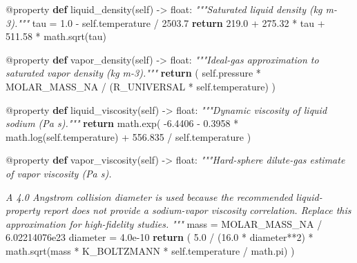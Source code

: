 \documentclass[
  12pt,
  12pt,a4paper,oneside]{report}
\newenvironment{Shaded}{}{}
\newcommand{\AttributeTok}[1]{\textcolor[rgb]{0.49,0.56,0.16}{#1}}
\newcommand{\BuiltInTok}[1]{\textcolor[rgb]{0.00,0.50,0.00}{#1}}
\newcommand{\CommentTok}[1]{\textcolor[rgb]{0.38,0.63,0.69}{\textit{#1}}}
\newcommand{\ControlFlowTok}[1]{\textcolor[rgb]{0.00,0.44,0.13}{\textbf{#1}}}
\newcommand{\DecValTok}[1]{\textcolor[rgb]{0.25,0.63,0.44}{#1}}
\newcommand{\FloatTok}[1]{\textcolor[rgb]{0.25,0.63,0.44}{#1}}
\newcommand{\KeywordTok}[1]{\textcolor[rgb]{0.00,0.44,0.13}{\textbf{#1}}}
\newcommand{\NormalTok}[1]{#1}
\newcommand{\OperatorTok}[1]{\textcolor[rgb]{0.40,0.40,0.40}{#1}}
\newcommand{\VariableTok}[1]{\textcolor[rgb]{0.10,0.09,0.49}{#1}}
\begin{document}
\begin{Shaded}
\begin{Highlighting}[]
    \AttributeTok{@property}
    \KeywordTok{def}\NormalTok{ liquid\_density(}\VariableTok{self}\NormalTok{) }\OperatorTok{{-}\textgreater{}} \BuiltInTok{float}\NormalTok{:}
        \CommentTok{"""Saturated liquid density (kg m{-}3)."""}
\NormalTok{        tau }\OperatorTok{=} \FloatTok{1.0} \OperatorTok{{-}} \VariableTok{self}\NormalTok{.temperature }\OperatorTok{/} \FloatTok{2503.7}
        \ControlFlowTok{return} \FloatTok{219.0} \OperatorTok{+} \FloatTok{275.32} \OperatorTok{*}\NormalTok{ tau }\OperatorTok{+} \FloatTok{511.58} \OperatorTok{*}\NormalTok{ math.sqrt(tau)}

    \AttributeTok{@property}
    \KeywordTok{def}\NormalTok{ vapor\_density(}\VariableTok{self}\NormalTok{) }\OperatorTok{{-}\textgreater{}} \BuiltInTok{float}\NormalTok{:}
        \CommentTok{"""Ideal{-}gas approximation to saturated vapor density (kg m{-}3)."""}
        \ControlFlowTok{return}\NormalTok{ (}
            \VariableTok{self}\NormalTok{.pressure }\OperatorTok{*}\NormalTok{ MOLAR\_MASS\_NA}
            \OperatorTok{/}\NormalTok{ (R\_UNIVERSAL }\OperatorTok{*} \VariableTok{self}\NormalTok{.temperature)}
\NormalTok{        )}

    \AttributeTok{@property}
    \KeywordTok{def}\NormalTok{ liquid\_viscosity(}\VariableTok{self}\NormalTok{) }\OperatorTok{{-}\textgreater{}} \BuiltInTok{float}\NormalTok{:}
        \CommentTok{"""Dynamic viscosity of liquid sodium (Pa s)."""}
        \ControlFlowTok{return}\NormalTok{ math.exp(}
            \OperatorTok{{-}}\FloatTok{6.4406} \OperatorTok{{-}} \FloatTok{0.3958} \OperatorTok{*}\NormalTok{ math.log(}\VariableTok{self}\NormalTok{.temperature)}
            \OperatorTok{+} \FloatTok{556.835} \OperatorTok{/} \VariableTok{self}\NormalTok{.temperature}
\NormalTok{        )}

    \AttributeTok{@property}
    \KeywordTok{def}\NormalTok{ vapor\_viscosity(}\VariableTok{self}\NormalTok{) }\OperatorTok{{-}\textgreater{}} \BuiltInTok{float}\NormalTok{:}
        \CommentTok{"""Hard{-}sphere dilute{-}gas estimate of vapor viscosity (Pa s).}

\CommentTok{        A 4.0 Angstrom collision diameter is used because the recommended}
\CommentTok{        liquid{-}property report does not provide a sodium{-}vapor viscosity}
\CommentTok{        correlation. Replace this approximation for high{-}fidelity studies.}
\CommentTok{        """}
\NormalTok{        mass }\OperatorTok{=}\NormalTok{ MOLAR\_MASS\_NA }\OperatorTok{/} \FloatTok{6.02214076e23}
\NormalTok{        diameter }\OperatorTok{=} \FloatTok{4.0e{-}10}
        \ControlFlowTok{return}\NormalTok{ (}
            \FloatTok{5.0} \OperatorTok{/}\NormalTok{ (}\FloatTok{16.0} \OperatorTok{*}\NormalTok{ diameter}\OperatorTok{**}\DecValTok{2}\NormalTok{)}
            \OperatorTok{*}\NormalTok{ math.sqrt(mass }\OperatorTok{*}\NormalTok{ K\_BOLTZMANN }\OperatorTok{*} \VariableTok{self}\NormalTok{.temperature }\OperatorTok{/}\NormalTok{ math.pi)}
\NormalTok{        )}


\end{Highlighting}
\end{Shaded}
\end{document}
